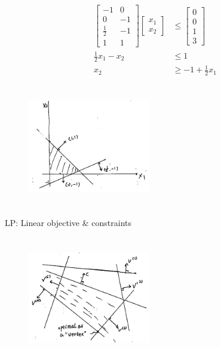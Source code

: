 \begin{example}
	\begin{align*}
	\begin{bmatrix}
	-1 & 0\\
	0 & -1\\
	\frac{1}{2} & -1\\
	1 & 1
	\end{bmatrix}
	\begin{bmatrix}
	x_1\\
	x_2
	\end{bmatrix}
	 &\leq 
	 \begin{bmatrix}
	 0\\
	 0\\
	 1\\
	 3
	 \end{bmatrix}\\
	 \frac{1}{2}x_1 - x_2&\leq 1\\
	 x_2 &\geq -1 + \frac{1}{2}x_1
	\end{align*}
	
	\begin{figure}
	\centering
	\includegraphics[width=2.1in,height=2.1in]{figures/ch07/figure1012_5.png}
	\end{figure}
\end{example}





LP: Linear objective \& constraints

\begin{figure}
	\centering
	\includegraphics[width=2.1in,height=2.1in]{figures/ch07/figure1012_6.png}
\end{figure}

